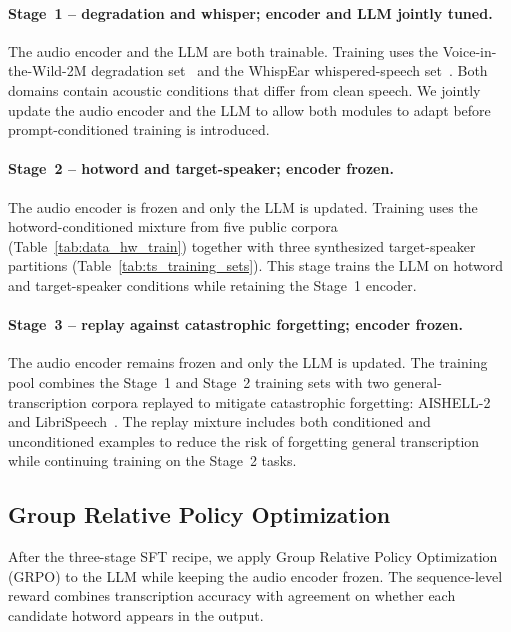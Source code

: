 \paragraph{Stage~1 -- degradation and whisper; encoder and LLM jointly tuned.}
The audio encoder and the LLM are both trainable. Training uses the
Voice-in-the-Wild-2M degradation set~\cite{xie2026mega} and the
WhispEar whispered-speech set~\cite{fang2025whisperear}.
Both domains contain acoustic conditions that differ from clean
speech.
We jointly update the audio encoder and the LLM to allow both modules
to adapt before prompt-conditioned training is introduced.

\paragraph{Stage~2 -- hotword and target-speaker; encoder frozen.}
The audio encoder is frozen and only the LLM is updated. Training uses
the hotword-conditioned mixture from five public corpora
(Table~\ref{tab:data_hw_train}) together with three synthesized
target-speaker partitions (Table~\ref{tab:ts_training_sets}).
This stage trains the LLM on hotword and target-speaker conditions
while retaining the Stage~1 encoder.

\paragraph{Stage~3 -- replay against catastrophic forgetting; encoder frozen.}
The audio encoder remains frozen and only the LLM is updated. The
training pool combines the Stage~1 and Stage~2 training sets with
two general-transcription corpora replayed to mitigate catastrophic
forgetting: AISHELL-2~\cite{du2018aishell2} and
LibriSpeech~\cite{panayotov2015librispeech}.
The replay mixture includes both conditioned and unconditioned
examples to reduce the risk of forgetting general transcription while
continuing training on the Stage~2 tasks.

\subsection{Group Relative Policy Optimization}
\label{subsec:grpo}

After the three-stage SFT recipe, we apply Group Relative Policy
Optimization (GRPO) to the LLM while keeping the audio
encoder frozen.
The sequence-level reward combines transcription accuracy with
agreement on whether each candidate hotword appears in the output.

